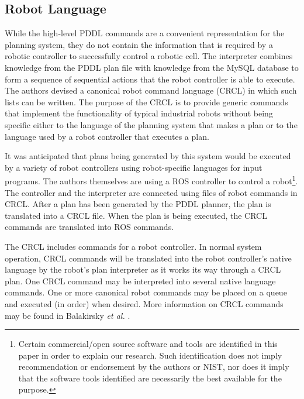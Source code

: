 \subsection{Robot Language}
While the high-level PDDL commands are a convenient representation
for the planning system, they do not contain the information that is
required by a robotic controller to successfully control a robotic cell.
The interpreter combines knowledge from the PDDL plan file with
knowledge from the MySQL database to form a sequence of sequential
actions that the robot controller is able to execute.
The authors devised a canonical robot
command language (CRCL) in which such lists can be written. The purpose of the
CRCL is to provide generic commands that
implement the functionality of typical industrial robots without being
specific either to the language of the planning system that makes a plan or
to the language used by a robot controller that executes a plan.

It was anticipated
that plans being generated by this system would
be executed by a variety of robot controllers using
robot-specific languages for input programs. The authors themselves are
using a ROS controller \cite{ROS} to control a
robot\footnote{Certain commercial/open source software and tools are identified
in this paper in order to explain our research. Such identification does not imply
recommendation or endorsement by the authors or NIST, nor does it
imply that the software tools identified are necessarily the best available for the purpose.}.
The controller and the interpreter are connected using files of robot commands in CRCL. After a plan
has been generated by the PDDL planner, the plan is translated into a CRCL
file. When the plan is being executed, the CRCL commands are translated
into ROS commands.

The CRCL includes commands for a robot controller. In normal system operation,
CRCL commands will be translated into the robot controller's native
language by the robot's plan interpreter as it works its way through a
CRCL plan. One CRCL command may be interpreted into several native
language commands.
One or more canonical robot commands may be placed on a queue and
executed (in order) when desired.
More information on CRCL commands may be found in
Balakirsky \textit{et al.} \cite{Balakirsky2012-1}.
